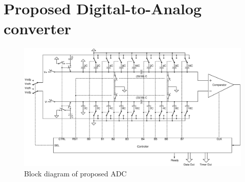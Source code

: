 \section{Proposed Digital-to-Analog converter}
\begin{figure}[H]
	\begin{center}
		\includegraphics[scale=0.4, angle=360]{./Figures/ADC.eps}
		\caption{Block diagram of proposed ADC}
		\label{fig:CMP}
	\end{center}
\end{figure}


